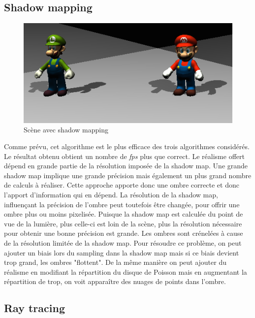 \documentclass[a4paper,10pt]{report}
\begin{document}
\subsection{Shadow mapping}

\begin{figure}[H]
\includegraphics[scale=0.4]{images/shadowmap.png}
\centering
\caption{Scène avec shadow mapping}
\end{figure}

Comme prévu, cet algorithme est le plus efficace des trois algorithmes considérés. Le résultat obtenu obtient un nombre de \textit{fps} plus que correct. Le réalisme offert dépend en grande partie de la résolution imposée de la shadow map. Une grande shadow map implique une grande précision mais également un plus grand nombre de calculs à réaliser. Cette approche apporte donc une ombre correcte et donc l'apport d'information qui en dépend. La résolution de la shadow map, influençant la précision de l'ombre peut toutefois être changée, pour offrir une ombre plus ou moins pixelisée. Puisque la shadow map est calculée du point de vue de la lumière, plus celle-ci est loin de la scène, plus la résolution nécessaire pour obtenir une bonne précision est grande.
Les ombres sont crénelées à cause de la résolution limitée de la shadow map. Pour résoudre ce problème, on peut ajouter un biais lors du sampling dans la shadow map mais si ce biais devient trop grand, les ombres "flottent".
De la même manière on peut ajouter du réalisme en modifiant la répartition du disque de Poisson mais en augmentant la répartition de trop, on voit apparaître des nuages de points dans l'ombre.


\subsection{Ray tracing}
\end{document}
